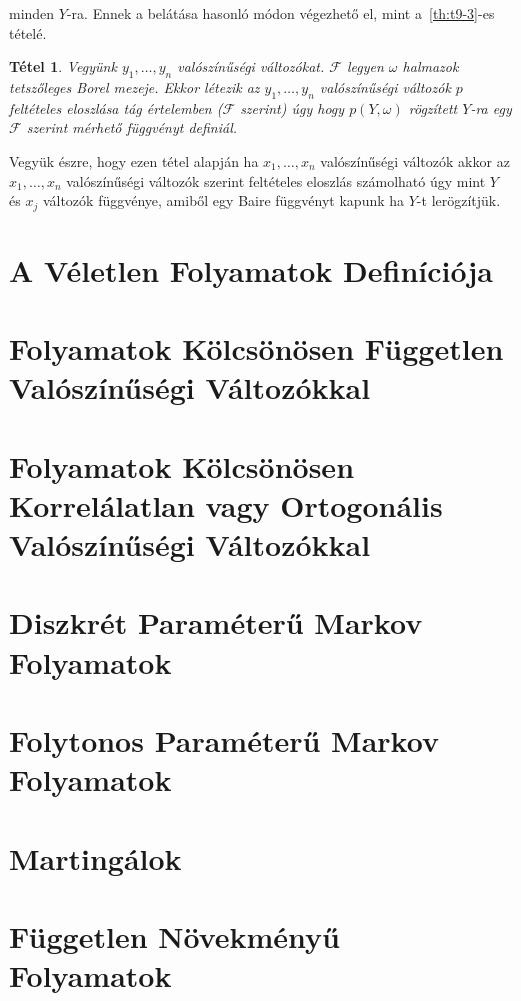 \documentclass{article}
\newtheorem{theorem}{Tétel}
\begin{document}
minden $Y$-ra. Ennek a belátása hasonló módon végezhető el, mint a~\ref{th:t9-3}-es tételé. 
\begin{theorem}\label{th:t9-4}
	Vegyünk $y_1,\ldots,y_n$ valószínűségi változókat. $\mathscr{F}$ legyen $\omega$ halmazok tetszőleges Borel mezeje. Ekkor létezik az $y_1,\ldots,y_n$ valószínűségi változók $p$ feltételes eloszlása tág értelemben ($\mathscr{F}$ szerint) úgy hogy $p(Y,\omega)$ rögzített $Y$-ra egy $\mathscr{F}$ szerint mérhető függvényt definiál.
\end{theorem}
Vegyük észre, hogy ezen tétel alapján ha $x_1,\ldots,x_n$ valószínűségi változók akkor az $x_1,\ldots,x_n$ valószínűségi változók szerint feltételes eloszlás számolható úgy mint $Y$ és $x_j$ változók függvénye, amiből egy Baire függvényt kapunk ha $Y$-t lerögzítjük.


\section{A Véletlen Folyamatok Definíciója}\label{sec:veletlenfolyamatokdefinicioja}
\section{Folyamatok Kölcsönösen Független Valószínűségi Változókkal}\label{sec:folyamatokkolcsonosenfuggetlenvaloszinusegivaltozokkal}
\section{Folyamatok Kölcsönösen Korrelálatlan vagy Ortogonális Valószínűségi Változókkal}\label{sec:folyamatokkolcsonosenkorrelalatlanvagyortogonalisvaloszinusegivaltozokkal}
\section{Diszkrét Paraméterű Markov Folyamatok}\label{sec:diszkretparameterumarkov}
\section{Folytonos Paraméterű Markov Folyamatok}\label{sec:folytonosparameterumarkov}
\section{Martingálok}\label{sec:martingalok}
\section{Független Növekményű Folyamatok}\label{sec:fuggetlennovekmenyufolyamatok}
\end{document}
